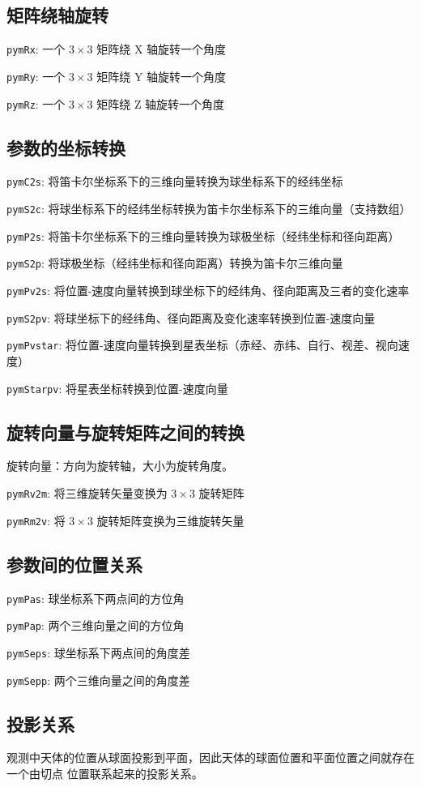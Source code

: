 \documentclass[11pt]{article}
\begin{document}
\subsection{矩阵绕轴旋转}
\texttt{pymRx}: 一个 $3\times3$ 矩阵绕 X 轴旋转一个角度

\texttt{pymRy}: 一个 $3\times3$ 矩阵绕 Y 轴旋转一个角度

\texttt{pymRz}: 一个 $3\times3$ 矩阵绕 Z 轴旋转一个角度

\subsection{参数的坐标转换}
\texttt{pymC2s}: 将笛卡尔坐标系下的三维向量转换为球坐标系下的经纬坐标

\texttt{pymS2c}: 将球坐标系下的经纬坐标转换为笛卡尔坐标系下的三维向量（支持数组）

\texttt{pymP2s}: 将笛卡尔坐标系下的三维向量转换为球极坐标（经纬坐标和径向距离）

\texttt{pymS2p}: 将球极坐标（经纬坐标和径向距离）转换为笛卡尔三维向量

\texttt{pymPv2s}: 将位置-速度向量转换到球坐标下的经纬角、径向距离及三者的变化速率

\texttt{pymS2pv}: 将球坐标下的经纬角、径向距离及变化速率转换到位置-速度向量

\texttt{pymPvstar}: 将位置-速度向量转换到星表坐标（赤经、赤纬、自行、视差、视向速度）

\texttt{pymStarpv}: 将星表坐标转换到位置-速度向量

\subsection{旋转向量与旋转矩阵之间的转换}
旋转向量：方向为旋转轴，大小为旋转角度。

\texttt{pymRv2m}: 将三维旋转矢量变换为 $3\times3$ 旋转矩阵

\texttt{pymRm2v}: 将 $3\times3$ 旋转矩阵变换为三维旋转矢量

\subsection{参数间的位置关系}
\texttt{pymPas}: 球坐标系下两点间的方位角

\texttt{pymPap}: 两个三维向量之间的方位角

\texttt{pymSeps}: 球坐标系下两点间的角度差

\texttt{pymSepp}: 两个三维向量之间的角度差

\subsection{投影关系}
观测中天体的位置从球面投影到平面，因此天体的球面位置和平面位置之间就存在一个由切点
位置联系起来的投影关系。
\end{document}
